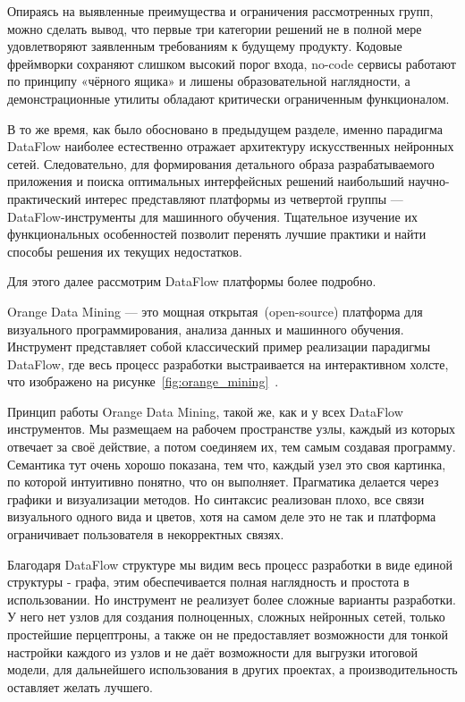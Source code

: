 \documentclass{report}
\begin{document}
Опираясь на выявленные преимущества и ограничения рассмотренных групп, можно сделать вывод, что первые три категории решений не в полной мере удовлетворяют заявленным требованиям к будущему продукту. Кодовые фреймворки сохраняют слишком высокий порог входа, no-code сервисы работают по принципу «чёрного ящика» и лишены образовательной наглядности, а демонстрационные утилиты обладают критически ограниченным функционалом.

В то же время, как было обосновано в предыдущем разделе, именно парадигма DataFlow наиболее естественно отражает архитектуру искусственных нейронных сетей. Следовательно, для формирования детального образа разрабатываемого приложения и поиска оптимальных интерфейсных решений наибольший научно-практический интерес представляют платформы из четвертой группы — DataFlow-инструменты для машинного обучения. Тщательное изучение их функциональных особенностей позволит перенять лучшие практики и найти способы решения их текущих недостатков.

Для этого далее рассмотрим DataFlow платформы более подробно.

Orange Data Mining — это мощная открытая~(open-source) платформа для визуального программирования, анализа данных и машинного обучения. Инструмент представляет собой классический пример реализации парадигмы DataFlow, где весь процесс разработки выстраивается на интерактивном холсте, что изображено на рисунке~\ref{fig:orange_mining}~\cite{bib_orange}.


Принцип работы Orange Data Mining, такой же, как и у всех DataFlow инструментов. Мы размещаем на рабочем пространстве узлы, каждый из которых отвечает за своё действие, а потом соединяем их, тем самым создавая программу. Семантика тут очень хорошо показана, тем что, каждый узел это своя картинка, по которой интуитивно понятно, что он выполняет. Прагматика делается через графики и визуализации методов. Но синтаксис реализован плохо, все связи визуального одного вида и цветов, хотя на самом деле это не так и платформа ограничивает пользователя в некорректных связях.  

Благодаря DataFlow структуре мы видим весь процесс разработки в виде единой структуры - графа, этим обеспечивается полная наглядность и простота в использовании. Но инструмент не реализует более сложные варианты разработки. У него нет узлов для создания полноценных, сложных нейронных сетей, только простейшие перцептроны, а также он не предоставляет возможности для тонкой настройки каждого из узлов и не даёт возможности для выгрузки итоговой модели, для дальнейшего использования в других проектах, а производительность оставляет желать лучшего.
\end{document}
